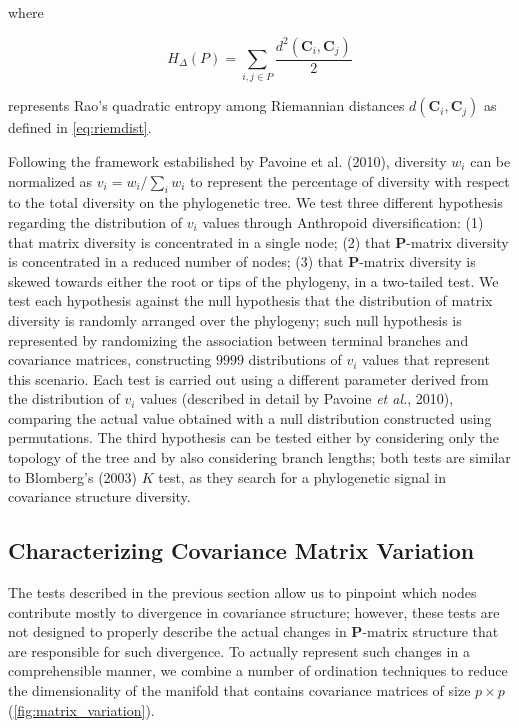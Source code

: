 \documentclass[12pt,twoside]{report}
\begin{document}
where

\begin{equation}
H_{\Delta} (P) = \sum_{i,j \in P} \frac{d^2(\mathbf{C}_i, \mathbf{C}_j)}{2}
\label{eq:rao}
\end{equation}

represents Rao's quadratic entropy among Riemannian distances
$d(\mathbf{C}_i, \mathbf{C}_j)$ as defined in \autoref{eq:riemdist}.

Following the framework estabilished by Pavoine et al. (2010), diversity
$w_i$ can be normalized as $v_i = w_i / \sum_i w_i$ to represent the
percentage of diversity with respect to the total diversity on the
phylogenetic tree. We test three different hypothesis regarding the
distribution of $v_i$ values through Anthropoid diversification: (1)
that matrix diversity is concentrated in a single node; (2) that
$\mathbf{P}$-matrix diversity is concentrated in a reduced number of
nodes; (3) that $\mathbf{P}$-matrix diversity is skewed towards either
the root or tips of the phylogeny, in a two-tailed test. We test each
hypothesis against the null hypothesis that the distribution of matrix
diversity is randomly arranged over the phylogeny; such null hypothesis
is represented by randomizing the association between terminal branches
and covariance matrices, constructing $9999$ distributions of $v_i$
values that represent this scenario. Each test is carried out using a
different parameter derived from the distribution of $v_i$ values
(described in detail by Pavoine \emph{et al.}, 2010), comparing the
actual value obtained with a null distribution constructed using
permutations. The third hypothesis can be tested either by considering
only the topology of the tree and by also considering branch lengths;
both tests are similar to Blomberg's (2003) $K$ test, as they search for
a phylogenetic signal in covariance structure diversity.

\subsection{Characterizing Covariance Matrix
Variation}\label{characterizing-covariance-matrix-variation}

The tests described in the previous section allow us to pinpoint which
nodes contribute mostly to divergence in covariance structure; however,
these tests are not designed to properly describe the actual changes in
$\mathbf{P}$-matrix structure that are responsible for such divergence.
To actually represent such changes in a comprehensible manner, we
combine a number of ordination techniques to reduce the dimensionality
of the manifold that contains covariance matrices of size $p \times p$
(\autoref{fig:matrix_variation}).
\end{document}

